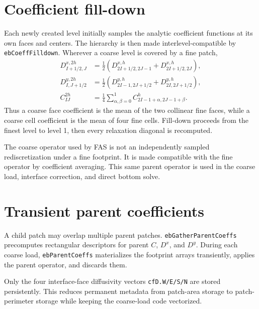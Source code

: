 \documentclass[11pt,oneside,openany]{book}
\newcommand{\code}[1]{\textnormal{\texttt{#1}}}
\begin{document}
\section{Coefficient fill-down}
Each newly created level initially samples the analytic coefficient functions at its own faces and centers. The hierarchy is then made interlevel-compatible by \code{ebCoeffFilldown}. Wherever a coarse level is covered by a fine patch,
\begin{align}
 D^{x,2h}_{I+1/2,J}
   &=\frac12\left(D^{x,h}_{2I+1/2,2J-1}+D^{x,h}_{2I+1/2,2J}\right),
   \label{eq:dxfill}\\
 D^{y,2h}_{I,J+1/2}
   &=\frac12\left(D^{y,h}_{2I-1,2J+1/2}+D^{y,h}_{2I,2J+1/2}\right),
   \label{eq:dyfill}\\
 C^{2h}_{IJ}
   &=\frac14\sum_{\alpha,\beta=0}^{1}C^h_{2I-1+\alpha,2J-1+\beta}.
   \label{eq:cfill}
\end{align}
Thus a coarse face coefficient is the mean of the two collinear fine faces, while a coarse cell coefficient is the mean of four fine cells. Fill-down proceeds from the finest level to level 1, then every relaxation diagonal is recomputed.

\begin{keyidea}
The coarse operator used by FAS is not an independently sampled rediscretization under a fine footprint. It is made compatible with the fine operator by coefficient averaging. This same parent operator is used in the coarse load, interface correction, and direct bottom solve.
\end{keyidea}

\section{Transient parent coefficients}
A child patch may overlap multiple parent patches. \code{ebGatherParentCoeffs} precomputes rectangular descriptors for parent $C$, $D^x$, and $D^y$. During each coarse load, \code{ebParentCoeffs} materializes the footprint arrays transiently, applies the parent operator, and discards them.

Only the four interface-face diffusivity vectors \code{cfD.W/E/S/N} are stored persistently. This reduces permanent metadata from patch-area storage to patch-perimeter storage while keeping the coarse-load code vectorized.
\end{document}
